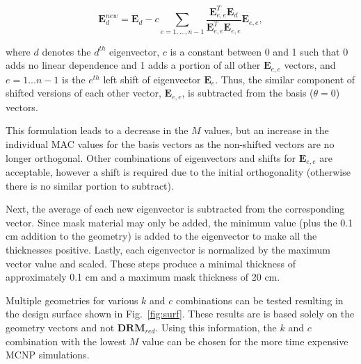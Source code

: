 \documentclass[3p,times]{elsarticle}
\begin{document}
\begin{equation}
\mathbf{E}^{new}_{d}=\mathbf{E}_{d}- c \sum_{e=1,...,n-1} \frac{\mathbf{E}_{e,e}^T \mathbf{E}_{d}}{\mathbf{E}_{e,e}^T \mathbf{E}_{e,e}}\mathbf{E}_{e,e},
\label{eq:GS}
\end{equation}

\noindent where $d$ denotes the $d^{th}$ eigenvector, $c$ is a constant between 0 and 1 such that 0 adds no linear dependence and 1 adds a portion of all other $\mathbf{E}_{e,e}$ vectors, and $e=1...n-1$ is the $e^{th}$ left shift of eigenvector $\mathbf{E}_e$. 
Thus, the similar component of shifted versions of each other vector, $\mathbf{E}_{e,e}$, is subtracted from the basis ($\theta=0$) vectors. 

This formulation leads to a decrease in the $M$ values, but an increase in the individual MAC values for the basis vectors as the non-shifted vectors are no longer orthogonal.
Other combinations of eigenvectors and shifts for $\mathbf{E}_{e,e}$ are acceptable, however a shift is required due to the initial orthogonality (otherwise there is no similar portion to subtract).

Next, the average of each new eigenvector is subtracted from the corresponding vector. 
Since mask material may only be added, the minimum value (plus the 0.1 cm addition to the geometry) is added to the eigenvector to make all the thicknesses positive.  
Lastly, each eigenvector is normalized by the maximum vector value and scaled. 
These steps produce a minimal thickness of approximately 0.1 cm and a maximum mask thickness of 20 cm.

Multiple geometries for various $k$ and $c$ combinations can be tested resulting in the design surface shown in Fig.~\ref{fig:surf}.  
These results are is based solely on the geometry vectors and not $\mathbf{DRM}_{red}$.  
Using this information, the $k$ and $c$ combination with the lowest $M$ value can be chosen for the more time expensive MCNP simulations.
\end{document}
